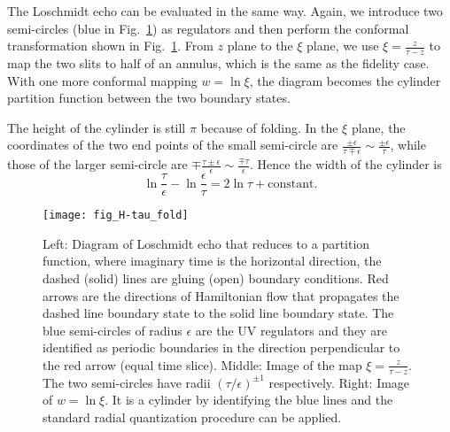 The Loschmidt echo can be evaluated in the same way. Again, we introduce two semi-circles (blue in Fig.~\ref{fig:H-tau_fold}) as regulators and then perform the conformal transformation shown in Fig.~\ref{fig:H-tau_fold}. From $z$ plane to the $\xi$ plane, we use $\xi = \frac{z}{\tau - z}$ to map the two slits to half of an annulus, which is the same as the fidelity case. With one more conformal mapping $w = \ln \xi$, the diagram becomes the cylinder partition function between the two boundary states. 

The height of the cylinder is still $\pi$ because of folding. In the $\xi$ plane, the coordinates of the two end points of the small semi-circle are $\frac{\pm \epsilon}{ \tau \mp \epsilon} \sim \frac{\pm \epsilon}{ \tau }$, while those of the larger semi-circle are $\mp \frac{\tau \pm \epsilon}{\epsilon} \sim \frac{\mp \tau}{\epsilon}$. Hence the width of the cylinder is
\begin{equation}
\label{eq:echo_cyd_width}
\ln \frac{\tau}{\epsilon} - \ln \frac{\epsilon}{\tau } = 2 \ln \tau + \text{constant}.  
\end{equation}

\begin{figure}[htb]
\centering
\texttt{[image: fig\_H-tau\_fold]}
\caption{Left: Diagram of Loschmidt echo that reduces to a partition function, where imaginary time is the horizontal direction, the dashed (solid) lines are gluing (open) boundary conditions. Red arrows are the directions of Hamiltonian flow that propagates the dashed line boundary state to the solid line boundary state. The blue semi-circles of radius $\epsilon$ are the UV regulators and they are identified as periodic boundaries in the direction perpendicular to the red arrow (equal time slice). Middle: Image of the map $\xi = \frac{z}{\tau - z}$. The two semi-circles have radii $({\tau}/{\epsilon})^{\pm1}$ respectively.  Right: Image of $w = \ln \xi$. It is a cylinder by identifying the blue lines and the standard radial quantization procedure can be applied. }
\label{fig:H-tau_fold}
\end{figure}

